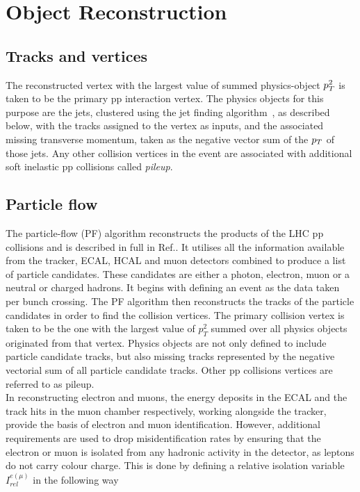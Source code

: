 \chapter{Object Reconstruction}
\label{sec:object_reconstruction}

\section{Tracks and vertices}

The reconstructed vertex with the largest value of summed physics-object $p_{T}^{2}$ is taken to be the primary pp interaction vertex. 
The physics objects for this purpose are the jets, clustered using the jet finding algorithm~\cite{Cacciari:2008gp,Cacciari:2011ma}, as described below, with the tracks assigned to the vertex as inputs, and the
associated missing transverse momentum, taken as the negative vector sum of the $p_{T}$ of those jets.
Any other collision vertices in the event are associated with additional soft inelastic pp collisions called \emph{pileup}.

\section{Particle flow}

The particle-flow (PF) algorithm reconstructs the products of the LHC pp collisions and is described in full in Ref.\cite{PF_CMS}.  
It utilises all the information available from the tracker, ECAL, HCAL and muon detectors combined to produce a list of particle candidates. 
These candidates are either a photon, electron, muon or a neutral or charged hadrons. It begins with defining an event as the data taken per bunch crossing. 
The PF algorithm then reconstructs the tracks of the particle candidates in order to find the collision vertices. 
The primary collision vertex is taken to be the one with the largest value of \(p_T^{2}\) summed over all physics objects originated from that vertex. 
Physics objects are not only defined to include particle candidate tracks, but also missing tracks represented by the negative vectorial sum of all particle candidate tracks. Other pp collisions vertices are referred to as pileup. \\

In reconstructing electron and muons, the energy deposits in the ECAL and the track hits in the muon chamber respectively, working alongside the tracker, provide the basis of electron and muon identification. However, additional requirements are used to drop misidentification rates by ensuring that the electron or muon is isolated from any hadronic activity in the detector, as leptons do not carry colour charge. This is done by defining a relative isolation variable \(I_{rel}^{e(\mu)}\) in the following way

